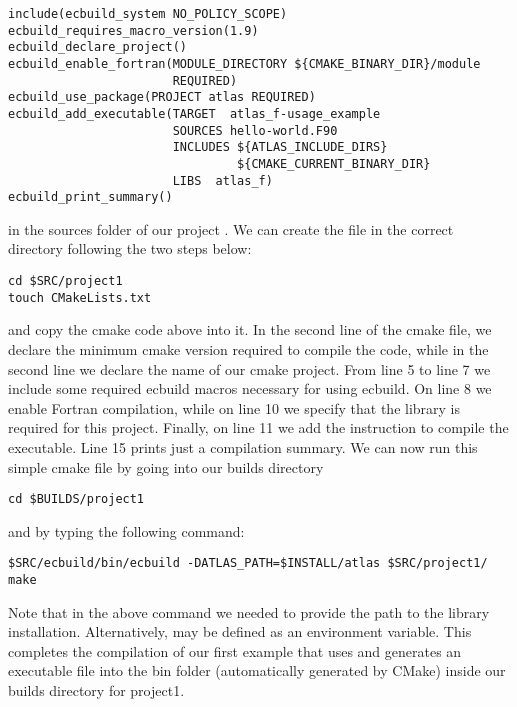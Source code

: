\begin{description}
\begin{lstlisting}[style=CMakeStyle]
include(ecbuild_system NO_POLICY_SCOPE)
ecbuild_requires_macro_version(1.9)
ecbuild_declare_project()
ecbuild_enable_fortran(MODULE_DIRECTORY ${CMAKE_BINARY_DIR}/module
                       REQUIRED)
ecbuild_use_package(PROJECT atlas REQUIRED)
ecbuild_add_executable(TARGET  atlas_f-usage_example
                       SOURCES hello-world.F90 
                       INCLUDES ${ATLAS_INCLUDE_DIRS}
                                ${CMAKE_CURRENT_BINARY_DIR}
                       LIBS  atlas_f)
ecbuild_print_summary()
\end{lstlisting}
%
in the sources folder of our project .
We can create the  file in the correct 
directory following the two steps below:
%
\begin{lstlisting}[style=BashStyle]
cd $SRC/project1
touch CMakeLists.txt
\end{lstlisting}
%
and copy the cmake code above into it.
In the second line of the cmake file, we declare the minimum cmake 
version required to compile the code, while in the second line 
we declare the name of our cmake project. 
From line 5 to line 7 we include some required ecbuild macros 
necessary for using ecbuild. On line 8 we enable Fortran compilation, 
while on line 10 we specify that the \Atlas library is required for 
this project. Finally, on line 11 we add the instruction to 
compile the executable.
Line 15 prints just a compilation summary. We can now run this simple 
cmake file by going into our builds directory 
%
\begin{lstlisting}[style=BashStyle]
cd $BUILDS/project1
\end{lstlisting}
%  
and by typing the following command:
%
\begin{lstlisting}[style=BashStyle]
$SRC/ecbuild/bin/ecbuild -DATLAS_PATH=$INSTALL/atlas $SRC/project1/
make 
\end{lstlisting}
%  
Note that in the above command we needed to provide the path 
to the \Atlas library installation.  Alternatively,
 may be defined as an environment variable.
This completes the compilation of our first example that uses
\Atlas and generates an executable file into the bin folder 
(automatically generated by CMake) inside our builds directory
for project1.
\end{description}
%

